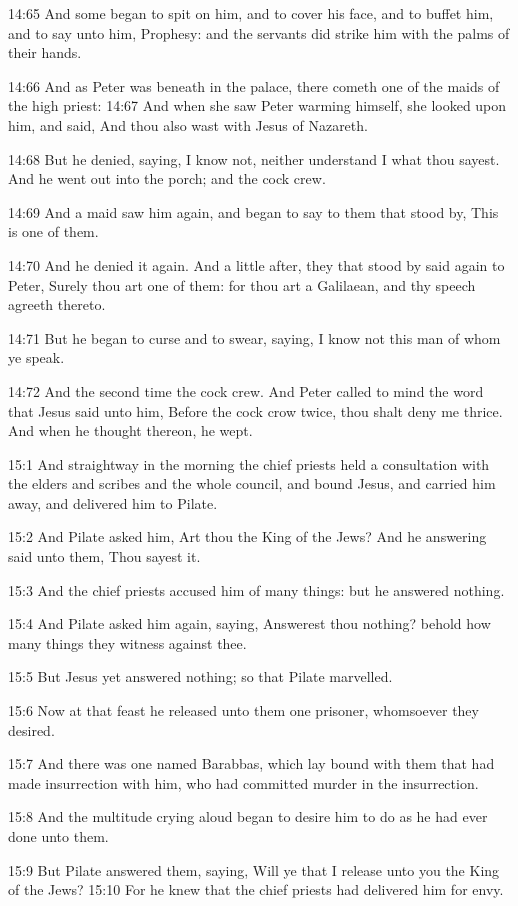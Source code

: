 14:65 And some began to spit on him, and to cover his face, and to buffet him, and to say unto him, Prophesy: and the servants did strike him with the palms of their hands.

14:66 And as Peter was beneath in the palace, there cometh one of the maids of the high priest: 14:67 And when she saw Peter warming himself, she looked upon him, and said, And thou also wast with Jesus of Nazareth.

14:68 But he denied, saying, I know not, neither understand I what thou sayest. And he went out into the porch; and the cock crew.

14:69 And a maid saw him again, and began to say to them that stood by, This is one of them.

14:70 And he denied it again. And a little after, they that stood by said again to Peter, Surely thou art one of them: for thou art a Galilaean, and thy speech agreeth thereto.

14:71 But he began to curse and to swear, saying, I know not this man of whom ye speak.

14:72 And the second time the cock crew. And Peter called to mind the word that Jesus said unto him, Before the cock crow twice, thou shalt deny me thrice. And when he thought thereon, he wept.

15:1 And straightway in the morning the chief priests held a consultation with the elders and scribes and the whole council, and bound Jesus, and carried him away, and delivered him to Pilate.

15:2 And Pilate asked him, Art thou the King of the Jews? And he answering said unto them, Thou sayest it.

15:3 And the chief priests accused him of many things: but he answered nothing.

15:4 And Pilate asked him again, saying, Answerest thou nothing?  behold how many things they witness against thee.

15:5 But Jesus yet answered nothing; so that Pilate marvelled.

15:6 Now at that feast he released unto them one prisoner, whomsoever they desired.

15:7 And there was one named Barabbas, which lay bound with them that had made insurrection with him, who had committed murder in the insurrection.

15:8 And the multitude crying aloud began to desire him to do as he had ever done unto them.

15:9 But Pilate answered them, saying, Will ye that I release unto you the King of the Jews?  15:10 For he knew that the chief priests had delivered him for envy.

